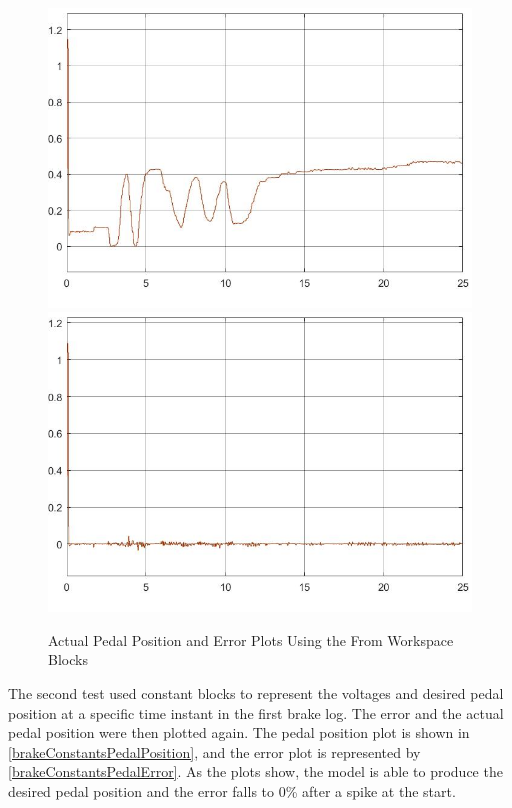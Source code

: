 \documentclass[journal,twoside,web]{ieeecolor}
\begin{document}
\begin{figure}[h]
	\centering
		{\includegraphics[width=0.48\linewidth]{figs/img/brakeSysActualPedalPositionFromWorkspaceBlocks}}
		{\includegraphics[width=0.48\linewidth]{figs/img/brakeSysPedalPositionErrorFromWorkspaceBlocks}}
	\caption{Actual Pedal Position and Error Plots Using the From Workspace Blocks}
\end{figure}


The second test used constant blocks to represent the voltages and desired pedal position at a specific time instant in the first brake log. The error and the actual pedal position were then plotted again. The pedal position plot is shown in \autoref{brakeConstantsPedalPosition}, and the error plot is represented by \autoref{brakeConstantsPedalError}. As the plots show, the model is able to produce the desired pedal position and the error falls to 0\% after a spike at the start. 
\end{document}

